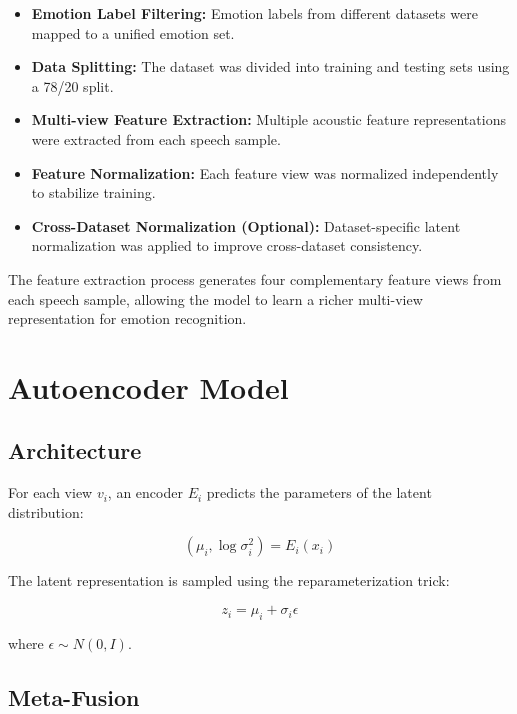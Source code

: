 \documentclass[conference]{IEEEtran}
\begin{document}
\begin{itemize}

\item \textbf{Emotion Label Filtering:} Emotion labels from different 
datasets were mapped to a unified emotion set.

\item \textbf{Data Splitting:} The dataset was divided into training 
and testing sets using a 78/20 split.

\item \textbf{Multi-view Feature Extraction:} Multiple acoustic feature 
representations were extracted from each speech sample.

\item \textbf{Feature Normalization:} Each feature view was normalized 
independently to stabilize training.

\item \textbf{Cross-Dataset Normalization (Optional):} Dataset-specific 
latent normalization was applied to improve cross-dataset consistency.

\end{itemize}

The feature extraction process generates four complementary feature 
views from each speech sample, allowing the model to learn a richer 
multi-view representation for emotion recognition.

\section{Autoencoder Model}

\subsection{Architecture}

For each view $v_i$, an encoder $E_i$ predicts the parameters of the latent distribution:

\begin{equation}
(\mu_i, \log \sigma_i^2) = E_i(x_i)
\end{equation}

The latent representation is sampled using the reparameterization trick:

\begin{equation}
z_i = \mu_i + \sigma_i \epsilon
\end{equation}

where $\epsilon \sim N(0, I)$.

\subsection{Meta-Fusion}
\end{document}
